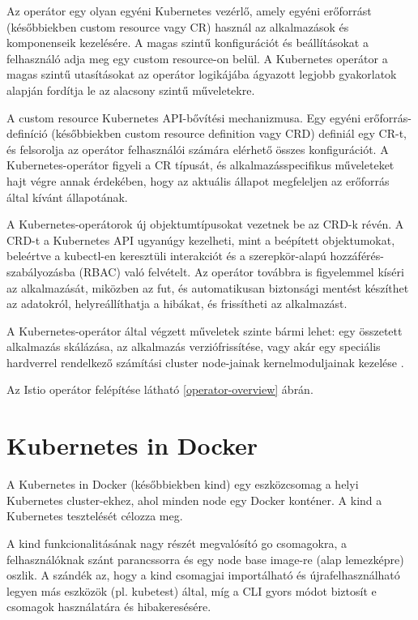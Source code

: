 Az operátor egy olyan egyéni Kubernetes vezérlő, amely egyéni erőforrást (későbbiekben custom resource vagy CR) használ az alkalmazások és komponenseik kezelésére.
A magas szintű konfigurációt és beállításokat a felhasználó adja meg egy custom resource-on belül.
A Kubernetes operátor a magas szintű utasításokat az operátor logikájába ágyazott legjobb gyakorlatok alapján fordítja le az alacsony szintű műveletekre.

A custom resource Kubernetes API-bővítési mechanizmusa.
Egy egyéni erőforrás-definíció (későbbiekben custom resource definition vagy CRD) definiál egy CR-t, és felsorolja az operátor felhasználói számára elérhető összes konfigurációt.
A Kubernetes-operátor figyeli a CR típusát, és alkalmazásspecifikus műveleteket hajt végre annak érdekében, hogy az aktuális állapot megfeleljen az erőforrás által kívánt állapotának.

A Kubernetes-operátorok új objektumtípusokat vezetnek be az CRD-k révén.
A CRD-t a Kubernetes API ugyanúgy kezelheti, mint a beépített objektumokat, beleértve a kubectl-en keresztüli interakciót és a szerepkör-alapú hozzáférés-szabályozásba (RBAC) való felvételt.
Az operátor továbbra is figyelemmel kíséri az alkalmazását, miközben az fut, és automatikusan biztonsági mentést készíthet az adatokról, helyreállíthatja a hibákat, és frissítheti az alkalmazást. 

A Kubernetes-operátor által végzett műveletek szinte bármi lehet: egy összetett alkalmazás skálázása, az alkalmazás verziófrissítése, vagy akár egy speciális hardverrel rendelkező számítási cluster node-jainak kernelmoduljainak kezelése \cite{RedHatKubOp}.

Az Istio operátor felépítése látható \ref{operator-overview} ábrán.

\newpage

\section{Kubernetes in Docker}
A Kubernetes in Docker (későbbiekben kind) egy eszközcsomag a helyi Kubernetes cluster-ekhez, ahol minden node egy Docker konténer. A kind a Kubernetes tesztelését célozza meg.

A kind funkcionalitásának nagy részét megvalósító go csomagokra, a felhasználóknak szánt parancssorra és egy node base image-re (alap lemezképre) oszlik. A szándék az, hogy a kind csomagjai importálható és újrafelhasználható legyen más eszközök (pl. kubetest) által, míg a CLI gyors módot biztosít e csomagok használatára és hibakeresésére.


